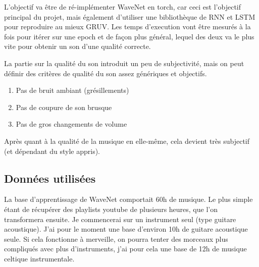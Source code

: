 \documentclass[a4paper]{article}
\begin{document}
L'objectif va être de ré-implémenter WaveNet en torch, car ceci est l'objectif principal du projet, mais également d'utiliser une bibliothèque de RNN et LSTM pour reproduire au mieux GRUV. Les temps d'execution vont être mesurés à la fois pour itérer sur une epoch et de façon plus général, lequel des deux va le plus vite pour obtenir un son d'une qualité correcte.

La partie sur la qualité du son introduit un peu de subjectivité, mais on peut définir des critères de qualité du son assez génériques et objectifs.

\begin{enumerate}
\item Pas de bruit ambiant (grésillements)
\item Pas de coupure de son brusque
\item Pas de gros changements de volume
\end{enumerate}

Après quant à la qualité de la musique en elle-même, cela devient très subjectif (et dépendant du style appris).

\subsection{Données utilisées}

La base d'apprentissage de WaveNet comportait 60h de musique. Le plus simple étant de récupérer des playlists youtube de plusieurs heures, que l'on transformera ensuite. Je commencerai sur un instrument seul (type guitare acoustique). J'ai pour le moment une base d'environ 10h de guitare acoustique seule. Si cela fonctionne à merveille, on pourra tenter des morceaux plus compliqués avec plus d'instruments, j'ai pour cela une base de 12h de musique celtique instrumentale.




\end{document}
